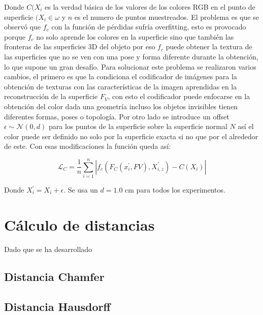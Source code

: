 Donde $C(X_{i}$ es la verdad básica de los valores de los colores RGB en el punto de superficie $(X_{i} \in \omega$ y $n$ es el numero de puntos muestreados. El problema es que se observó que $f_{c}$ con la función de pérdidas sufría overfitting, esto es provocado porque $f_{c}$ no solo aprende los colores en la superficie sino que también las fronteras de las superficies 3D del objeto por eso $f_{c}$ puede obtener la textura de las  superficies que no se ven con una pose y forma diferente durante la obtención, lo que supone un gran desafío. Para solucionar este problema se realizaron varios cambios, el primero es que la condiciona el codificador de imágenes para la obtención de texturas con las características de la imagen aprendidas en la reconstrucción de la superficie $F_{V}$, con esto el codificador puede enfocarse en la obtención del color dada una geometría incluso los objetos invisibles tienen diferentes formas, poses o topología. Por otro lado se introduce un offset $\epsilon \sim \mathcal{N}(0, d)$ para los puntos de la superficie sobre la superficie normal $N$ así el color puede ser definido no solo por la superficie exacta si no que por el alrededor de este. Con esas modificaciones la función queda así:

\begin{equation}
	\label{eq:5}
	\mathcal{L}_{C} = \frac{1}{n} 
	\sum_{i=1}^{n} | f_{c} (F_{C}(x_{i}^{'}, F{V}), X_{i,z}^{'}) - C(X_{i}) |
\end{equation}

Donde $ X_{i}^{'} = X_{i} + \epsilon$. Se usa un $d = 1.0$ cm para todos los experimentos.

\section{Cálculo de distancias}

Dado que se ha desarrollado

\subsection{Distancia Chamfer}

\subsection{Distancia Hausdorff}


\clearpage
